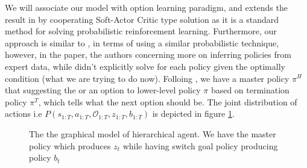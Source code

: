\label{sec:chap4-single-soft-HRL}
We will associate our model with option learning paradigm, and extends the result in \cite{igl2019multitask} by cooperating Soft-Actor Critic type solution as it is a standard method for solving probabilistic reinforcement learning. Furthermore, our approach is similar to \cite{daniel2016probabilistic}, in terms of using a similar probabilistic technique, however, in the paper, the authors concerning more on inferring policies from expert data, while didn't explicitly solve for each policy given the optimally condition (what we are trying to do now). Folloing \cite{igl2019multitask}, we have a master policy $\pi^H$ that suggesting the  or an option to lower-level policy $\pi$ based on termination policy $\pi^T$, which tells what the next option should be. The joint distribution of actions i.e $P(s_{1:T}, a_{1:T}, \mathcal{O}_{1:T}, z_{1:T}, b_{1:T})$ is depicted in figure \ref{fig:chap4-single-agent-hierarchical}.
\begin{figure}[ht]
    \begin{minipage}[t]{0.5\linewidth}
    \centering
    \end{minipage}%
    \begin{minipage}[t]{0.5\linewidth}
    \caption{The the graphical model of hierarchical agent. We have the master policy which produces $z_t$ while having switch goal policy producing policy $b_t$}
    \label{fig:chap4-single-agent-hierarchical}
    \end{minipage}
\end{figure}
